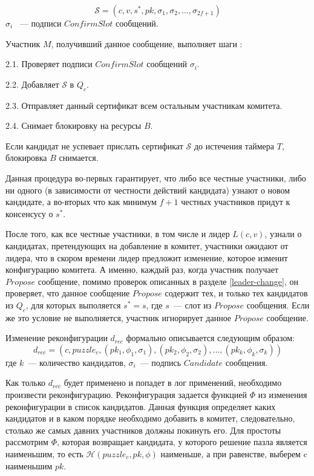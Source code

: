 $$\mathcal{S}=(c, v, s^{*}, pk, \sigma_1, \sigma_2,..., \sigma_{2f+1})$$
$\sigma_i$ ~--- подписи $ConfirmSlot$ сообщений.
\vspace{10pt}

Участник $M$, получивший данное сообщение, выполняет шаги : 

2.1. Проверяет подписи $ConfirmSlot$ сообщений $\sigma_i$.

2.2. Добавляет $\mathcal{S}$ в $Q_c$.

2.3. Отправляет данный сертификат всем остальным участникам комитета.

2.4. Снимает блокировку на ресурсы $B$.

Если кандидат не успевает прислать сертификат $\mathcal{S}$ до истечения таймера $T$, блокировка $B$ снимается.

Данная процедура во-первых гарантирует, что либо все честные участники, либо ни одного (в зависимости от честности действий кандидата) узнают о новом кандидате, а во-вторых что как минимум $f+1$ честных участников придут к консенсусу о $s^{*}$.

После того, как все честные участники, в том числе и лидер $L(c, v)$, узнали о кандидатах, претендующих на добавление в комитет, участники ожидают от лидера, что в скором времени лидер предложит изменение, которое изменит конфигурацию комитета. А именно, каждый раз, когда участник получает $Propose$ сообщение, помимо проверок описанных в  разделе \ref{leader-change}, он проверяет, что данное сообщение $Propose$ содержит тех, и только тех кандидатов из $Q_c$, для которых выполяется $s^{*} = s$, где $s$~--- слот из $Propose$ сообщения. Если же это условие не выполняется, участник игнорирует данное $Propose$ сообщение.

Изменение реконфигурации $d_{rec}$ формально описывается следующим образом:
$$d_{rec}=(c, puzzle_c, (pk_1, \phi_1, \sigma_1), (pk_2, \phi_2, \sigma_2),...,(pk_k, \phi_k, \sigma_k))$$
где $k$~--- количество кандидатов, $\sigma_i$~--- подпись $Candidate$ сообщения.

Как только $d_{rec}$ будет применено и попадет в лог применений, необходимо произвести реконфигурацию.
Реконфигурация задается функцией $\Phi$ из изменения реконфигурации в список кандидатов. Данная функция определяет каких кандидатов и в каком порядке необходимо добавить в комитет, следовательно, столько же самых давних участников должны покинуть его. Для простоты рассмотрим $\Phi$, которая возвращает кандидата, у которого решение пазла является наименьшим, то есть $\mathcal{H}(puzzle_c, pk, \phi)$ наименьше, а при равенстве, выберем c наименьшим $pk$.

